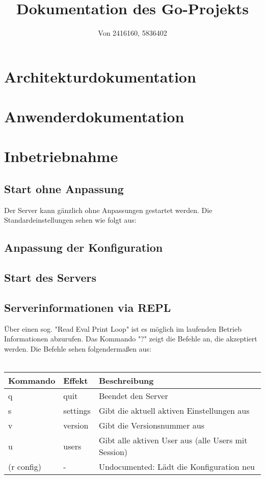 \documentclass[10pt]{article}
\title{Dokumentation des Go-Projekts}
\author{Von 2416160, 5836402}
\date{}
\begin{document}
\maketitle
	\section{Architekturdokumentation}
	\section{Anwenderdokumentation}
	\section{Inbetriebnahme}
		\subsection{Start ohne Anpassung}
		Der Server kann g\"anzlich ohne Anpassungen gestartet werden.
		Die Standardeinstellungen sehen wie folgt aus:
		
		\subsection{Anpassung der Konfiguration}
		\subsection{Start des Servers}
		\subsection{Serverinformationen via REPL}
		\"Uber einen sog. "Read Eval Print Loop" ist es m\"oglich im laufenden Betrieb Informationen abzurufen.
		Das Kommando "?" zeigt die Befehle an, die akzeptiert werden. Die Befehle sehen folgenderma{\ss}en aus:\\\\
		\begin{tabular}{l|l|l}
			Kommando   & Effekt   & Beschreibung\\
			\hline
			q          & quit     & Beendet den Server\\
			s          & settings & Gibt die aktuell aktiven Einstellungen aus\\
			v          & version  & Gibt die Versionsnummer aus\\
			u          & users    & Gibt alle aktiven User aus (alle Users mit Session)\\
			(r config) & -        & Undocumented: L\"adt die Konfiguration neu
		\end{tabular}
\end{document}

